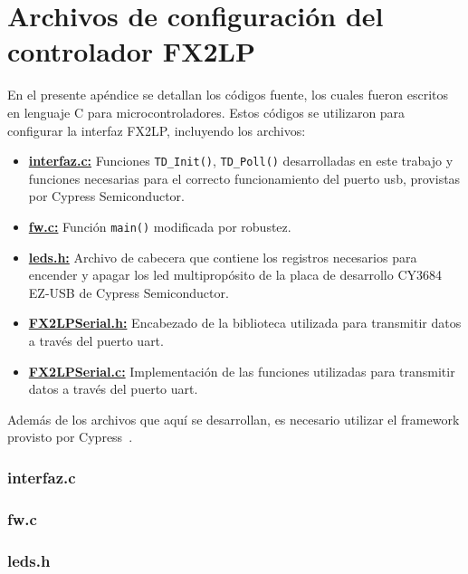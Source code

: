 \chapter{Archivos de configuración del controlador FX2LP}
	\label{ap:fx2lp}
	En el presente apéndice se detallan los códigos fuente, los cuales fueron escritos en lenguaje C para microcontroladores. Estos códigos se utilizaron para configurar la interfaz FX2LP, incluyendo los archivos:
	\begin{itemize}
		\item \hyperref[ap:fx2lp:ifc]{\textbf{interfaz.c:}} Funciones \verb|TD_Init()|, \verb|TD_Poll()| desarrolladas en este trabajo y funciones necesarias para el correcto funcionamiento del puerto \acrshort{usb}, provistas por Cypress Semiconductor.
		\item \hyperref[ap:fx2lp:fwc]{\textbf{fw.c:}} Función \verb|main()| modificada por robustez.
		\item \hyperref[ap:fx2lp:ledh]{\textbf{leds.h:}} Archivo de cabecera que contiene los registros necesarios para encender y apagar los \acrshort{led} multipropósito de la placa de desarrollo CY3684 EZ-USB de Cypress Semiconductor.
		\item \hyperref[ap:fx2lp:serh]{\textbf{FX2LPSerial.h:}} Encabezado de la biblioteca utilizada para transmitir datos a través del puerto \acrshort{uart}.
		\item \hyperref[ap:fx2lp:serc]{\textbf{FX2LPSerial.c:}} Implementación de las funciones utilizadas para transmitir datos a través del puerto \acrshort{uart}.
	\end{itemize}
	
	Además de los archivos que aquí se desarrollan, es necesario utilizar el framework provisto por Cypress~\cite{CypressSemiconductor2020}.
	
	\subsection*{interfaz.c}
		\label{ap:fx2lp:ifc}
		
	\subsection*{fw.c}
		\label{ap:fx2lp:fwc}
		
	\subsection*{leds.h}
		\label{ap:fx2lp:ledh}
		
		
